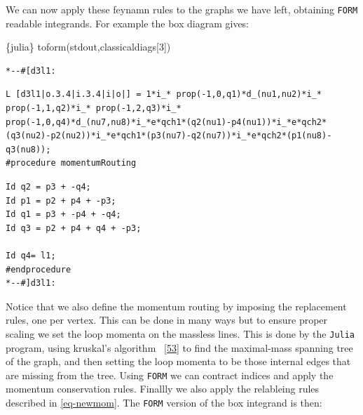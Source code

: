 \documentclass[
  10pt,
  a4paper,
  DIV=11,
  numbers=noendperiod,
  twoside]{scrreprt}
\newenvironment{Shaded}{\begin{snugshade}}{\end{snugshade}}
\newcommand{\DecValTok}[1]{\textcolor[rgb]{0.68,0.00,0.00}{#1}}
\newcommand{\InformationTok}[1]{\textcolor[rgb]{0.37,0.37,0.37}{#1}}
\newcommand{\NormalTok}[1]{\textcolor[rgb]{0.00,0.23,0.31}{#1}}
\DeclareRobustCommand{\[}{\begin{equation}}
\DeclareRobustCommand{\]}{\end{equation}}
\begin{document}
We can now apply these feynamn rules to the graphs we have left,
obtaining \texttt{FORM} readable integrands. For example the box diagram
gives:

\begin{Shaded}
\begin{Highlighting}[]
\InformationTok{\textasciigrave{}\textasciigrave{}\textasciigrave{}\{julia\}}
\NormalTok{toform(stdout,classicaldiags[}\DecValTok{3}\NormalTok{])}
\InformationTok{\textasciigrave{}\textasciigrave{}\textasciigrave{}}
\end{Highlighting}
\end{Shaded}

\begin{verbatim}
*--#[d3l1:
\end{verbatim}

\begin{verbatim}
L [d3l1|o.3.4|i.3.4|i|o|] = 1*i_* prop(-1,0,q1)*d_(nu1,nu2)*i_* prop(-1,1,q2)*i_* prop(-1,2,q3)*i_* prop(-1,0,q4)*d_(nu7,nu8)*i_*e*qch1*(q2(nu1)-p4(nu1))*i_*e*qch2*(q3(nu2)-p2(nu2))*i_*e*qch1*(p3(nu7)-q2(nu7))*i_*e*qch2*(p1(nu8)-q3(nu8));
#procedure momentumRouting
\end{verbatim}

\begin{verbatim}
Id q2 = p3 + -q4;
Id p1 = p2 + p4 + -p3;
Id q1 = p3 + -p4 + -q4;
Id q3 = p2 + p4 + q4 + -p3;

Id q4= l1;
#endprocedure
*--#]d3l1:
\end{verbatim}

Notice that we also define the momentum routing by imposing the
replacement rules, one per vertex. This can be done in many ways but to
ensure proper scaling we set the loop momenta on the massless lines.
This is done by the \texttt{Julia} program, using kruskal's algorithm
~{[}\protect\hyperlink{ref-Kruskal:1956}{53}{]} to find the maximal-mass
spanning tree of the graph, and then setting the loop momenta to be
those internal edges that are missing from the tree. Using \texttt{FORM}
we can contract indices and apply the momentum conservation rules.
Finallly we also apply the relableing rules described in
\ref{eq-newmom}. The \texttt{FORM} version of the box integrand is then:
\end{document}
